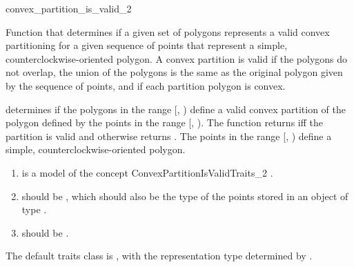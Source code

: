 \renewcommand\ccRefPageBegin{\ccParDims\cgalColumnLayout\begin{ccAdvanced}}
\renewcommand\ccRefPageEnd{\ccParDims\cgalColumnLayout\end{ccAdvanced}}
\begin{ccRefFunction}{convex_partition_is_valid_2}

\ccDefinition
Function that determines if a given set of polygons represents
a valid convex partitioning for a given sequence of points that represent a
simple, counterclockwise-oriented polygon.  
A convex partition is valid if the 
polygons do not overlap, the union of the polygons is the same as the original
polygon given by the sequence of points, and if each partition polygon is 
convex. 


{
determines if the polygons in the range [, )
define a valid convex partition of the polygon defined by the points in the 
range [, ). 
The function returns  iff the partition is valid and otherwise
returns .
\ccPrecond The points in the range [, ) 
define a simple, counterclockwise-oriented polygon.
}

\begin{enumerate}
    \item {} is a model of the concept
          ConvexPartitionIsValidTraits\_2%
          .
    \item {} should be ,
          which should also be the type of the points stored in an object
          of type .
    \item {} should be 
          .
\end{enumerate}

The default traits class  is ,%
with the representation type determined by .


\end{ccRefFunction}
